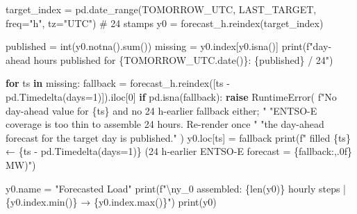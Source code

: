 \documentclass[
  english,
  letterpaper,
]{scrbook}
\newenvironment{Shaded}{\begin{snugshade}}{\end{snugshade}}
\newcommand{\BuiltInTok}[1]{\textcolor[rgb]{0.00,0.23,0.31}{#1}}
\newcommand{\CharTok}[1]{\textcolor[rgb]{0.13,0.47,0.30}{#1}}
\newcommand{\CommentTok}[1]{\textcolor[rgb]{0.37,0.37,0.37}{#1}}
\newcommand{\ControlFlowTok}[1]{\textcolor[rgb]{0.00,0.23,0.31}{\textbf{#1}}}
\newcommand{\DecValTok}[1]{\textcolor[rgb]{0.68,0.00,0.00}{#1}}
\newcommand{\KeywordTok}[1]{\textcolor[rgb]{0.00,0.23,0.31}{\textbf{#1}}}
\newcommand{\NormalTok}[1]{\textcolor[rgb]{0.00,0.23,0.31}{#1}}
\newcommand{\OperatorTok}[1]{\textcolor[rgb]{0.37,0.37,0.37}{#1}}
\newcommand{\PreprocessorTok}[1]{\textcolor[rgb]{0.68,0.00,0.00}{#1}}
\newcommand{\SpecialCharTok}[1]{\textcolor[rgb]{0.37,0.37,0.37}{#1}}
\newcommand{\SpecialStringTok}[1]{\textcolor[rgb]{0.13,0.47,0.30}{#1}}
\newcommand{\StringTok}[1]{\textcolor[rgb]{0.13,0.47,0.30}{#1}}
\begin{document}
\protect{}\label{entsoe-extract}
\begin{Shaded}
\begin{Highlighting}[]
\NormalTok{target\_index }\OperatorTok{=}\NormalTok{ pd.date\_range(TOMORROW\_UTC, LAST\_TARGET, freq}\OperatorTok{=}\StringTok{"h"}\NormalTok{, tz}\OperatorTok{=}\StringTok{"UTC"}\NormalTok{)  }\CommentTok{\# 24 stamps}
\NormalTok{y0 }\OperatorTok{=}\NormalTok{ forecast\_h.reindex(target\_index)}

\NormalTok{published }\OperatorTok{=} \BuiltInTok{int}\NormalTok{(y0.notna().}\BuiltInTok{sum}\NormalTok{())}
\NormalTok{missing }\OperatorTok{=}\NormalTok{ y0.index[y0.isna()]}
\BuiltInTok{print}\NormalTok{(}\SpecialStringTok{f"day{-}ahead hours published for }\SpecialCharTok{\{}\NormalTok{TOMORROW\_UTC}\SpecialCharTok{.}\NormalTok{date()}\SpecialCharTok{\}}\SpecialStringTok{: }\SpecialCharTok{\{}\NormalTok{published}\SpecialCharTok{\}}\SpecialStringTok{ / 24"}\NormalTok{)}

\ControlFlowTok{for}\NormalTok{ ts }\KeywordTok{in}\NormalTok{ missing:}
\NormalTok{    fallback }\OperatorTok{=}\NormalTok{ forecast\_h.reindex([ts }\OperatorTok{{-}}\NormalTok{ pd.Timedelta(days}\OperatorTok{=}\DecValTok{1}\NormalTok{)]).iloc[}\DecValTok{0}\NormalTok{]}
    \ControlFlowTok{if}\NormalTok{ pd.isna(fallback):}
        \ControlFlowTok{raise} \PreprocessorTok{RuntimeError}\NormalTok{(}
            \SpecialStringTok{f"No day{-}ahead value for }\SpecialCharTok{\{}\NormalTok{ts}\SpecialCharTok{\}}\SpecialStringTok{ and no 24 h{-}earlier fallback either; "}
            \StringTok{"ENTSO{-}E coverage is too thin to assemble 24 hours. Re{-}render once "}
            \StringTok{"the day{-}ahead forecast for the target day is published."}
\NormalTok{        )}
\NormalTok{    y0.loc[ts] }\OperatorTok{=}\NormalTok{ fallback}
    \BuiltInTok{print}\NormalTok{(}\SpecialStringTok{f"  filled }\SpecialCharTok{\{}\NormalTok{ts}\SpecialCharTok{\}}\SpecialStringTok{ ← }\SpecialCharTok{\{}\NormalTok{ts }\OperatorTok{{-}}\NormalTok{ pd}\SpecialCharTok{.}\NormalTok{Timedelta(days}\OperatorTok{=}\DecValTok{1}\NormalTok{)}\SpecialCharTok{\}}\SpecialStringTok{ (24 h{-}earlier ENTSO{-}E forecast = }\SpecialCharTok{\{}\NormalTok{fallback}\SpecialCharTok{:,.0f\}}\SpecialStringTok{ MW)"}\NormalTok{)}

\NormalTok{y0.name }\OperatorTok{=} \StringTok{"Forecasted Load"}
\BuiltInTok{print}\NormalTok{(}\SpecialStringTok{f"}\CharTok{\textbackslash{}n}\SpecialStringTok{y\_0 assembled: }\SpecialCharTok{\{}\BuiltInTok{len}\NormalTok{(y0)}\SpecialCharTok{\}}\SpecialStringTok{ hourly steps | }\SpecialCharTok{\{}\NormalTok{y0}\SpecialCharTok{.}\NormalTok{index}\SpecialCharTok{.}\BuiltInTok{min}\NormalTok{()}\SpecialCharTok{\}}\SpecialStringTok{ → }\SpecialCharTok{\{}\NormalTok{y0}\SpecialCharTok{.}\NormalTok{index}\SpecialCharTok{.}\BuiltInTok{max}\NormalTok{()}\SpecialCharTok{\}}\SpecialStringTok{"}\NormalTok{)}
\BuiltInTok{print}\NormalTok{(y0)}
\end{Highlighting}
\end{Shaded}
\end{document}
